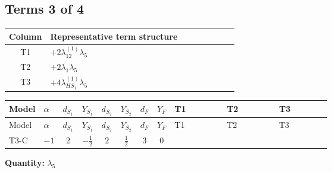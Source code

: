 \documentclass[8pt]{article}
\begin{document}
\begin{landscape}
\subsection*{Terms 3 of 4}
\begin{center}
\begin{tabular}{@{}c >{\raggedright\arraybackslash}p{0.82\linewidth}@{}}
\toprule
Column & Representative term structure \\
\midrule
T1 & \(\displaystyle +2 {\lambda_{12}^{(1)}} {\lambda_5}\) \\
\midrule
T2 & \(\displaystyle +2 {\lambda_1} {\lambda_5}\) \\
\midrule
T3 & \(\displaystyle +4 {\lambda_{HS_1}^{(1)}} {\lambda_5}\) \\
\midrule
\bottomrule
\end{tabular}
\end{center}
\smallskip
\tiny
\begin{longtable}{@{}llcccccc >{\raggedright\arraybackslash}p{0.21\linewidth} >{\raggedright\arraybackslash}p{0.21\linewidth} >{\raggedright\arraybackslash}p{0.21\linewidth}@{}}
\toprule
Model & $\alpha$ & $d_{S_1}$ & $Y_{S_1}$ & $d_{S_2}$ & $Y_{S_2}$ & $d_F$ & $Y_F$ & T1 & T2 & T3 \\
\midrule
\endfirsthead
\toprule
Model & $\alpha$ & $d_{S_1}$ & $Y_{S_1}$ & $d_{S_2}$ & $Y_{S_2}$ & $d_F$ & $Y_F$ & T1 & T2 & T3 \\
\midrule
\endhead
T3-C & $-1$ & $2$ & $-\frac{1}{2}$ & $2$ & $\frac{1}{2}$ & $3$ & $0$ & \scriptsize\adjustbox{max width=\linewidth}{$\begin{gathered} +2 {\lambda_{12}^{(1)}} {\lambda_5}\end{gathered}$} & \scriptsize\adjustbox{max width=\linewidth}{$\begin{gathered} +2 {\lambda_1} {\lambda_5}\end{gathered}$} & \scriptsize\adjustbox{max width=\linewidth}{$\begin{gathered} +4 {\lambda_{HS_1}^{(1)}} {\lambda_5}\end{gathered}$} \\
\midrule
\bottomrule
\end{longtable}
\clearpage
\noindent\textbf{Quantity: }$\lambda_5$\par\smallskip

\end{landscape}
\end{document}
